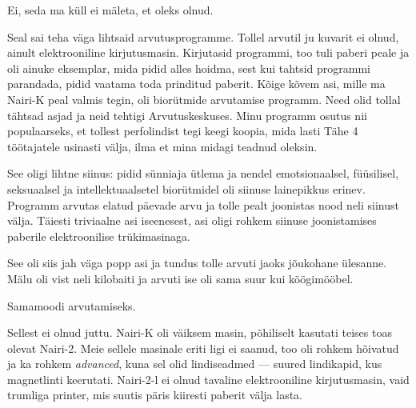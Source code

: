Ei, seda ma küll ei mäleta, et oleks olnud.


Seal sai teha väga lihtsaid arvutusprogramme. Tollel 
arvutil ju kuvarit ei olnud, ainult elektrooniline kirjutusmasin. 
Kirjutasid programmi, too tuli paberi peale ja oli ainuke eksemplar, mida pidid alles hoidma, sest kui tahtsid programmi parandada, pidid vaatama toda prinditud paberit. Kõige kõvem asi, mille ma 
Nairi-K peal valmis tegin, oli biorütmide arvutamise programm. Need olid tollal 
tähtsad asjad ja neid tehtigi Arvutuskeskuses. Minu programm osutus nii
populaarseks, et tollest 
perfolindist tegi keegi koopia, mida lasti Tähe 4 
töötajatele usinasti välja, ilma et mina midagi teadnud oleksin.


See oligi lihtne siinus: pidid sünniaja ütlema ja nendel emotsionaalsel, füüsilisel, seksuaalsel ja intellektuaalsetel biorütmidel oli siinuse 
lainepikkus erinev. Programm arvutas elatud päevade arvu ja tolle pealt 
joonistas nood neli siinust välja. Täiesti 
triviaalne asi iseenesest, asi oligi rohkem siinuse joonistamises paberile elektroonilise trükimasinaga. 


See oli siis jah väga popp asi ja tundus tolle arvuti jaoks 
jõukohane ülesanne. Mälu oli vist neli kilobaiti ja arvuti ise oli sama suur kui köögimööbel.


Samamoodi arvutamiseks.


Sellest ei olnud juttu. Nairi-K oli 
väiksem masin, põhiliselt kasutati teises toas olevat Nairi-2. Meie sellele masinale eriti ligi ei saanud, too 
oli rohkem hõivatud ja ka rohkem \emph{advanced}, kuna sel 
olid lindiseadmed --- suured lindikapid, kus magnetlinti 
keerutati. Nairi-2-l ei olnud tavaline elektrooniline kirjutusmasin, 
vaid trumliga printer, mis suutis päris kiiresti paberit 
välja lasta.

